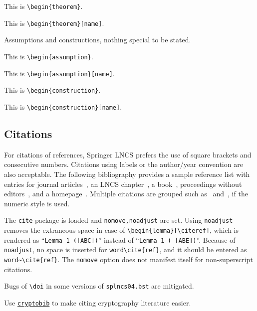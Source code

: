 \begin{theorem}
This is \texttt{\textbackslash begin\{theorem\}}.
\end{theorem}

\begin{theorem}[name]\label{thm:theorem10}
This is \texttt{\textbackslash begin\{theorem\}[name]}.
\end{theorem}

\noindent
Assumptions and constructions, nothing special to be stated.

\begin{assumption}
This is \texttt{\textbackslash begin\{assumption\}}.
\end{assumption}

\begin{assumption}[name]
This is \texttt{\textbackslash begin\{assumption\}[name]}.
\end{assumption}

\begin{construction}
This is \texttt{\textbackslash begin\{construction\}}.
\end{construction}

\begin{construction}[name]
This is \texttt{\textbackslash begin\{construction\}[name]}.
\end{construction}

\subsection{Citations}

For citations of references, Springer LNCS prefers the use of square brackets
and consecutive numbers. Citations using labels or the author/year
convention are also acceptable. The following bibliography provides
a sample reference list with entries for journal
articles~\cite{ref_article1}, an LNCS chapter~\cite{ref_lncs1}, a
book~\cite{ref_book1}, proceedings without editors~\cite{ref_proc1},
and a homepage~\cite{ref_url1}. Multiple citations are grouped
such as~\cite{ref_article1,ref_lncs1,ref_book1}
and~\cite{ref_article1,ref_book1,ref_proc1,ref_url1},
if the numeric style is used.

The \texttt{cite} package is loaded and \texttt{nomove,noadjust} are set.
Using \texttt{noadjust} removes the extraneous space
in case of \texttt{\textbackslash begin\{lemma\}[\textbackslash cite{ref}]},
which is rendered as ``\texttt{Lemma 1 ([ABC])}''
instead of ``\texttt{Lemma 1 ( [ABE])}''.
Because of \texttt{noadjust},
no space is inserted for \texttt{word\textbackslash cite\{ref\}},
and it should be entered as
\texttt{word\textasciitilde\textbackslash cite\{ref\}}.
The \texttt{nomove} option does not manifest itself
for non-superscript citations.

Bugs of \texttt{\textbackslash doi}
in some versions of \texttt{splncs04.bst}
are mitigated.

Use \href{https://github.com/cryptobib/export}{\texttt{cryptobib}} to make citing cryptography literature easier.
